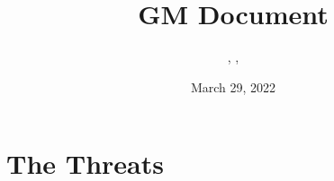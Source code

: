 \documentclass{../../extra/styles/SecureRole}
\title{GM Document}
\author{\Ba, \Wi, \Zm}
\date{March 29, 2022}
\begin{document}
\makecover
\newpage

\tableofcontents
\newpage













\chapter{The Threats}




















\end{document}
